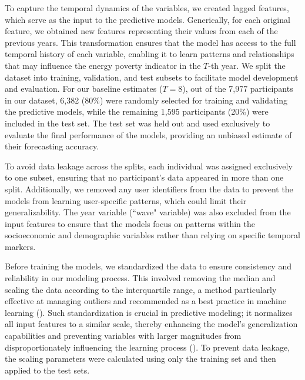 \documentclass[preprint,authoryear,12pt]{elsarticle}
\newcommand{\citeTwo}[1]{(\cite{#1})}
\begin{document}
To capture the temporal dynamics of the variables, we created lagged features, which serve as the input to the predictive models. Generically, for each original feature, we obtained new features representing their values from each of the previous years. This transformation ensures that the model has access to the full temporal history of each variable, enabling it to learn patterns and relationships that may influence the energy poverty indicator in the $T$-th year. We split the dataset into training, validation, and test subsets to facilitate model development and evaluation. For our baseline estimates ($T=8$), out of the 7,977 participants in our dataset, 6,382 (80\%) were randomly selected for training and validating the predictive models, while the remaining 1,595 participants (20\%) were included in the test set. The test set was held out and used exclusively to evaluate the final performance of the models, providing an unbiased estimate of their forecasting accuracy.

To avoid data leakage across the splits, each individual was assigned exclusively to one subset, ensuring that no participant’s data appeared in more than one split. Additionally, we removed any user identifiers from the data to prevent the models from learning user-specific patterns, which could limit their generalizability. The year variable (``wave" variable) was also excluded from the input features to ensure that the models focus on patterns within the socioeconomic and demographic variables rather than relying on specific temporal markers.

Before training the models, we standardized the data to ensure consistency and reliability in our modeling process. This involved removing the median and scaling the data according to the interquartile range, a method particularly effective at managing outliers and recommended as a best practice in machine learning \citeTwo{SWW21}. Such standardization is crucial in predictive modeling; it normalizes all input features to a similar scale, thereby enhancing the model’s generalization capabilities and preventing variables with larger magnitudes from disproportionately influencing the learning process \citeTwo{MHTOSC24}. To prevent data leakage, the scaling parameters were calculated using only the training set and then applied to the test sets.
\end{document}
